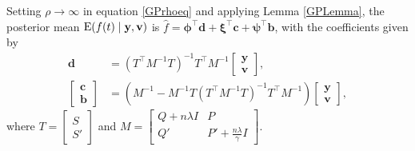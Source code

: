 Setting $\rho \rightarrow \infty$ in equation \eqref{GPrhoeq} and applying Lemma \ref{GPLemma}, the posterior mean $\mathrm{E} (f(t)\mid \mathbf{y},\mathbf{v})$ is $\hat{f}  = \mathbf{\phi}^\top \mathbf{d}+\mathbf{\xi}^\top \mathbf{c}+\mathbf{\psi}^\top \mathbf{b}$, with the coefficients given by
\begin{align*} 
\mathbf{d}&=\left(T^\top M^{-1}T\right)^{-1}T^\top M^{-1}\begin{bmatrix}\mathbf{y} \\ \mathbf{v} \end{bmatrix},\\
\begin{bmatrix}\mathbf{c}\\ \mathbf{b}\end{bmatrix} &=
\left(M^{-1}-M^{-1}T\left(T^\top M^{-1} T\right)^{-1}T^\top M^{-1}\right)\begin{bmatrix}\mathbf{y}\\ \mathbf{v} \end{bmatrix},
\end{align*} 
where $T=\begin{bmatrix} S\\S' \end{bmatrix}$ and $M=\begin{bmatrix} Q+n\lambda I& P\\
Q'& P'+\frac{n\lambda}{\gamma}I
\end{bmatrix}$.

